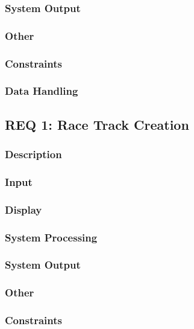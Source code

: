 \documentclass[a4paper, 11pt]{article} %
\begin{document}
\subsubsection{System Output}

\subsubsection{Other}

\subsubsection{Constraints}

\subsubsection{Data Handling}

\newpage

\subsection{REQ 1: Race Track Creation}

\subsubsection{Description}

\subsubsection{Input}

\subsubsection{Display}

\subsubsection{System Processing}

\subsubsection{System Output}

\subsubsection{Other}

\subsubsection{Constraints}
\end{document}
